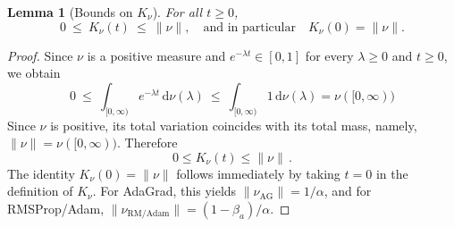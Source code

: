 \documentclass{article} %
\newtheorem{proposition}{Proposition}
\newtheorem{lemma}{Lemma}
\begin{document}
\begin{lemma}[Bounds on $K_\nu$]\label{lem:puntual}
For all \( t \geq 0 \),
\[
    0 \ \leq\ K_\nu(t) \ \leq\ \|\nu\|,
    \quad\text{and in particular}\quad
    K_\nu(0) = \|\nu\|.
\]
\end{lemma}
\begin{proof}
Since \(\nu\) is a positive measure and \( e^{-\lambda t} \in [0,1] \) for every \( \lambda \geq 0 \) and \( t \geq 0 \), we obtain
\[
    0 \ \leq \ \int_{[0,\infty)} e^{-\lambda t} \,\mathrm{d}\nu(\lambda) 
      \ \leq \ \int_{[0,\infty)} 1 \,\mathrm{d}\nu(\lambda) 
      = \nu([0,\infty)) 
\]
Since $\nu$ is positive, its total variation coincides with its total mass, namely, $\|\nu\| = \nu([0,\infty))$. Therefore
\[
0\leq K_\nu(t) \leq \| \nu\|\,.
\]
The identity \( K_\nu(0) = \|\nu\| \) follows immediately by taking \( t = 0 \) in the definition of \(K_\nu\). For AdaGrad, this yields $\|\nu_\mathrm{AG}\| = 1/\alpha$, and for RMSProp/Adam, $\|\nu_\mathrm{RM/Adam}\| = (1-\beta_a)/\alpha$.
\end{proof}



\end{document}
